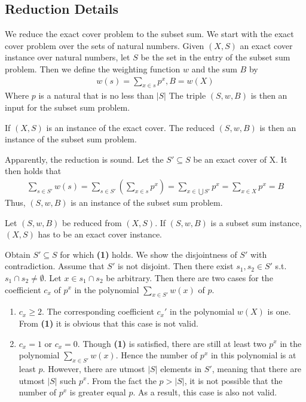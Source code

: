 \subsection{Reduction Details}
We reduce the exact cover problem to the subset sum. We start with the exact cover problem over the sets of natural numbers. 
Given $(X, S)$ an exact cover instance over natural numbers, let $S$ be the set in the entry of the subset sum problem. Then we
define the weighting function $w$ and the sum $B$ by 
\begin{align*}
    w(s) = \sum_{x \in s} p^x , B = w(X)
\end{align*}
Where $p$ is a natural that is no less than $|S|$
The triple $(S, w, B)$ is then an input for the subset sum problem.
\begin{lemma}[Soundness]
    If $(X, S)$ is an instance of the exact cover. The reduced $(S, w, B)$ is then an instance of the subset sum problem. 
\end{lemma}
Apparently, the reduction is sound. Let the $S' \subseteq S$ be an exact cover of X. It then holds that
\begin{align*}
    \sum_{s \in S'} w(s) = \sum_{s \in S'} (\sum_{x \in s} p^x) = \sum_{x \in \bigcup S'} p^x = \sum_{x \in X} p^x = B
\end{align*}
Thus, $(S, w, B)$ is an instance of the subset sum problem. 
\begin{lemma}[Completeness]
    Let $(S, w, B)$ be reduced from $(X, S)$. If $(S, w, B)$ is a subset sum instance, $(X, S)$ has to be an exact cover instance. 
\end{lemma}
Obtain $S' \subseteq S$ for which \textbf{(1)} holds. We show the disjointness of $S'$ with contradiction. 
Assume that $S'$ is not disjoint. Then there exist $s_1, s_2 \in S'$ s.t. $s_1 \cap s_2 \not= \emptyset$. Let $x \in s_1 \cap s_2$ be arbitrary. Then 
there are two cases for the coefficient $c_x$ of $p^x$ in the polynomial $\sum_{x \in S'} w(x)$ of $p$. 
\begin{enumerate}
    \item $c_x \geq 2$. The corresponding coefficient $c_x'$ in the polynomial $w(X)$ is one. From \textbf{(1)} it is obvious that this case is not valid.
    \item $c_x = 1$ or $c_x = 0$. Though \textbf{(1)} is satisfied, there are still at least two $p^x$ in the polynomial $\sum_{x \in S'} w(x)$.
    Hence the number of $p^x$ in this polynomial is at least $p$. However, there are utmost $|S|$ elements in $S'$, meaning that there are utmost $|S|$ such $p^x$. From the 
    fact the $p > |S|$, it is not possible that the number of $p^x$ is greater equal $p$. As a result, this case is also not valid.
\end{enumerate}
